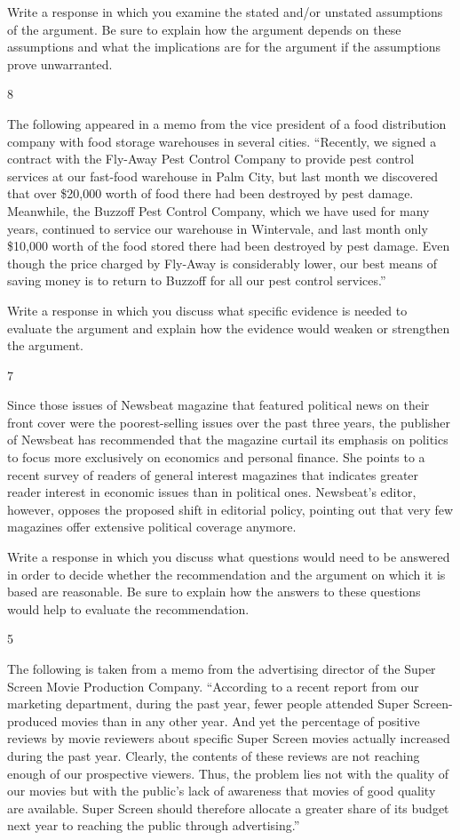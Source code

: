 \documentclass[]{article}
\begin{document}
Write a response in which you examine the stated and/or unstated
assumptions of the argument. Be sure to explain how the argument depends
on these assumptions and what the implications are for the argument if
the assumptions prove unwarranted.

8

The following appeared in a memo from the vice president of a food
distribution company with food storage warehouses in several cities.
``Recently, we signed a contract with the Fly-Away Pest Control Company
to provide pest control services at our fast-food warehouse in Palm
City, but last month we discovered that over \$20,000 worth of food
there had been destroyed by pest damage. Meanwhile, the Buzzoff Pest
Control Company, which we have used for many years, continued to service
our warehouse in Wintervale, and last month only \$10,000 worth of the
food stored there had been destroyed by pest damage. Even though the
price charged by Fly-Away is considerably lower, our best means of
saving money is to return to Buzzoff for all our pest control
services.''

Write a response in which you discuss what specific evidence is needed
to evaluate the argument and explain how the evidence would weaken or
strengthen the argument.

7

Since those issues of Newsbeat magazine that featured political news on
their front cover were the poorest-selling issues over the past three
years, the publisher of Newsbeat has recommended that the magazine
curtail its emphasis on politics to focus more exclusively on economics
and personal finance. She points to a recent survey of readers of
general interest magazines that indicates greater reader interest in
economic issues than in political ones. Newsbeat's editor, however,
opposes the proposed shift in editorial policy, pointing out that very
few magazines offer extensive political coverage anymore.

Write a response in which you discuss what questions would need to be
answered in order to decide whether the recommendation and the argument
on which it is based are reasonable. Be sure to explain how the answers
to these questions would help to evaluate the recommendation.

5

The following is taken from a memo from the advertising director of the
Super Screen Movie Production Company. ``According to a recent report
from our marketing department, during the past year, fewer people
attended Super Screen-produced movies than in any other year. And yet
the percentage of positive reviews by movie reviewers about specific
Super Screen movies actually increased during the past year. Clearly,
the contents of these reviews are not reaching enough of our prospective
viewers. Thus, the problem lies not with the quality of our movies but
with the public's lack of awareness that movies of good quality are
available. Super Screen should therefore allocate a greater share of its
budget next year to reaching the public through advertising.''
\end{document}
